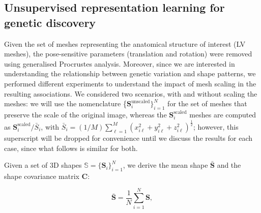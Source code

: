 

\subsection{Unsupervised representation learning for genetic discovery}
\label{results:dimensionality_reduction}
Given the set of meshes representing the anatomical structure of interest (LV meshes), the pose-sensitive parameters (translation and rotation) were removed using generalised Procrustes analysis. Moreover, since we are interested in understanding the relationship between genetic variation and shape patterns, we performed different experiments to understand the impact of mesh scaling in the resulting associations. We considered two scenarios, with and without scaling the meshes: we will use the nomenclature \{$\textbf{S}_{i}^{\text{unscaled}}\}_{i=1}^{N}$ for the set of meshes that preserve the scale of the original image, whereas the $\textbf{S}_{i}^{\text{scaled}}$ meshes are computed as $\textbf{S}_{i}^{\text{scaled}}/\bar{S}_i$, with $\bar{S}_i=(1/M)\sum_{\ell=1}^{M}(x_{i\ell}^2+y_{i\ell}^2+z_{i\ell}^2)^{\frac{1}{2}}$; however, this superscript will be dropped for convenience until we discuss the results for each case, since what follows is similar for both.

Given a set of 3D shapes $\mathbb{S}=\{\textbf{S}_i\}_{i=1}^{N}$, we derive the mean shape $\bar{\textbf{S}}$ and the shape covariance matrix $\textbf{C}$:

\begin{equation}
\bar{\textbf{S}}=\frac{1}{N}\sum_{i=1}^{N}{\textbf{S}},
\end{equation}

